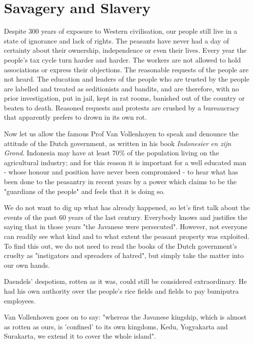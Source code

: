 \section{Savagery and Slavery}

Despite 300 years of exposure to Western civilisation, our people still live 
in a state of ignorance and lack of rights. The peasants have never had a day 
of certainty about their ownership, independence or even their lives. Every year 
the people's tax cycle turn harder and harder. The workers are not allowed to 
hold associations or express their objections. The reasonable requests of the 
people are not heard. The education and leaders of the people who are trusted 
by the people are labelled and treated as seditionists and bandits, and are 
therefore, with no prior investigation, put in jail, kept in rat rooms, 
banished out of the country or beaten to death. Reasoned requests and protests 
are crushed by a bureaucracy that apparently prefers to drown in its own rot.\nline

Now let us allow the famous Prof Van Vollenhoyen to speak and 
denounce the attitude of the Dutch government, as written in his 
book \emph{Indonesier en zijn Grond}. Indonesia may have at least 70\% of 
the population living on the agricultural industry; and for this reason it is important 
for a well educated man - whose honour and position have never been compromised - 
to hear what has been done to the peasantry in recent years by a power which claims 
to be the "guardians of the people" and feels that it is doing so.\nline

We do not want to dig up what has already happened, so let's first talk about the events of 
the past 60 years of the last century. Everybody knows and justifies the saying that in 
those years "the Javanese were persecuted". However, not everyone can readily see what kind 
and to what extent the peasant property was exploited. To find this out, we do not need to 
read the books of the Dutch government's cruelty as "instigators and spreaders of hatred", but simply take the matter into our own hands.\nline

Daendels' despotism, rotten as it was, could still be considered extraordinary. 
He had his own authority over the people's rice fields and fields to pay bumiputra employees.\nline

Van Vollenhoven goes on to say: 
"whereas the Javanese kingship, which is almost as rotten as ours, is 'confined' to its own kingdoms, Kedu, 
Yogyakarta and Surakarta, we extend it to cover the whole island".\nline

